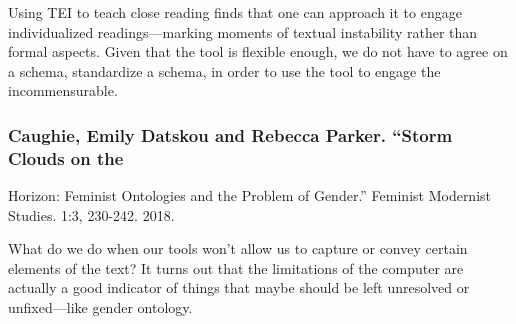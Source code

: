\documentclass[11pt]{article}
\begin{document}
Using TEI to teach close reading finds that one can approach it to
engage individualized readings---marking moments of textual
instability rather than formal aspects. Given that the tool is
flexible enough, we do not have to agree on a schema, standardize a
schema, in order to use the tool to engage the incommensurable.


\subsubsection{Caughie, Emily Datskou and Rebecca Parker. “Storm Clouds on the}
\label{sec:org9927277}
Horizon: Feminist Ontologies and the Problem of Gender.” Feminist
Modernist Studies. 1:3, 230-242. 2018.

What do we do when our tools won’t allow us to capture or convey
certain elements of the text? It turns out that the limitations of the
computer are actually a good indicator of things that maybe should be
left unresolved or unfixed---like gender ontology.
\end{document}
